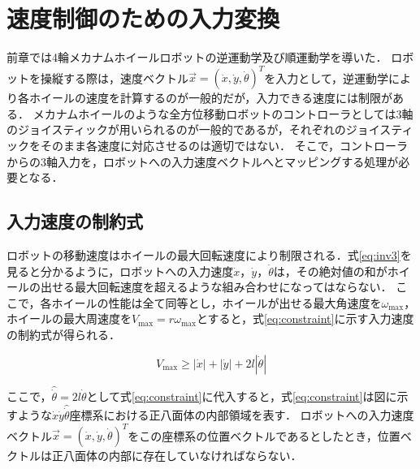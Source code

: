 \documentclass[../master]{subfiles}
\begin{document}
  \section{速度制御のための入力変換}

  前章では4輪メカナムホイールロボットの逆運動学及び順運動学を導いた．
  ロボットを操縦する際は，速度ベクトル$\vec{x} = (\dot{x}, \dot{y}, \dot{\theta})^T$を入力として，逆運動学により各ホイールの速度を計算するのが一般的だが，入力できる速度には制限がある．
  メカナムホイールのような全方位移動ロボットのコントローラとしては3軸のジョイスティックが用いられるのが一般的であるが，それぞれのジョイスティックをそのまま各速度に対応させるのは適切ではない．
  そこで，コントローラからの3軸入力を，ロボットへの入力速度ベクトルへとマッピングする処理が必要となる．

  \subsection{入力速度の制約式}

  ロボットの移動速度はホイールの最大回転速度により制限される．式\ref{eq:inv3}を見ると分かるように，ロボットへの入力速度$\dot{x}$，$\dot{y}$，$\dot{\theta}$は，その絶対値の和がホイールの出せる最大回転速度を超えるような組み合わせになってはならない．
  ここで，各ホイールの性能は全て同等とし，ホイールが出せる最大角速度を$\omega_{\text{max}}$，ホイールの最大周速度を$V_{\text{max}} = r \omega_{\text{max}}$とすると，式\ref{eq:constraint}に示す入力速度の制約式が得られる．

  \begin{equation}
    V_{\text{max}} \geq |\dot{x}| + |\dot{y}| + 2l|\dot{\theta}|
    \label{eq:constraint}
  \end{equation}

  ここで，$\hat{\dot{\theta}} = 2l\dot{\theta}$として式\ref{eq:constraint}に代入すると，式\ref{eq:constraint}は図に示すような$\dot{x}\dot{y}\hat{\dot{\theta}}$座標系における正八面体の内部領域を表す．
  ロボットへの入力速度ベクトル$\vec{x} = (\dot{x}, \dot{y}, \dot{\theta})^T$をこの座標系の位置ベクトルであるとしたとき，位置ベクトルは正八面体の内部に存在していなければならない．
\end{document}
